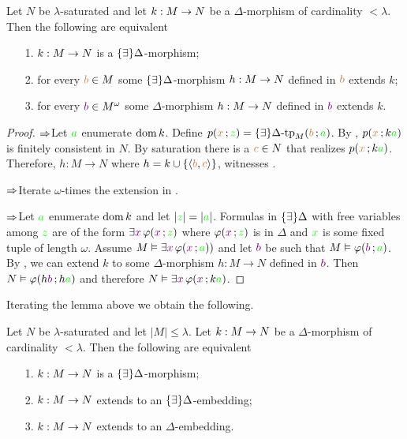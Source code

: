 \begin{proposition}\label{prop_EDelta_estensione}
Let $N$ be $\lambda$-saturated and let $k:M\rightarrow N$ be a $\Delta$-morphism of cardinality $<\lambda$. Then the following are equivalent
\begin{itemize}
\item[1.] $k:M\rightarrow N$ is a $\{\exists\}\Delta$-morphism;
\item[2.] for every ${\color{brown} b}\in M$ some $\{\exists\}\Delta$-morphism $h:M\rightarrow N$ defined in ${\color{brown} b}$ extends $k$;
\item[3.] for every ${\color{violet} b}\in M^{\omega}$ some $\Delta$-morphism $h:M\rightarrow N$ defined in ${\color{violet} b}$ extends $k$.
\end{itemize}
\end{proposition}

\begin{proof}
$\Rightarrow$\quad Let ${\color{green} a}$ enumerate $\mathop{\rm dom} k$. Define $p({\color{brown} x}\,;{\color{green} z})=\{\exists\}\Delta\mbox{-}\textrm{tp}_M ({\color{brown} b}\,;{\color{green} a})$. By , $p({\color{brown} x}\,;k{\color{green} a})$ is finitely consistent in $N$. By saturation there is a ${\color{brown} c}\in N$ that realizes $p({\color{brown} x}\,;k{\color{green} a})$. Therefore, $h:M\to N$ where $h=k\cup\{\langle{\color{brown}b},{\color{brown} c}\rangle\}$, witnesses .

$\Rightarrow$\quad Iterate $\omega$-times the extension in . 

$\Rightarrow$\quad Let ${\color{green} a}$ enumerate $\mathop{\rm dom} k$ and let $|{\color{green} z}|=|{\color{green} a}|$. Formulas in $\{\exists\}\Delta$ with free variables among ${\color{green} z}$ are of the form  $\exists {\color{violet}x}\, \varphi ({\color{violet} x}\,;{\color{green} z})$ where $\varphi({\color{violet} x}\,;{\color{green} z})$ is in $\Delta$ and ${\color{green} x}$ is some fixed tuple of length $\omega$. Assume $M\vDash\exists{\color{violet}x}\,\varphi({\color{violet} x}\,;{\color{green} a}))$ and let ${\color{violet} b}$ be such that $M\vDash\varphi({\color{violet} b}\,;{\color{green} a})$. By , we can extend $k$ to some $\Delta$-morphism $h:M\to N$ defined in ${\color{violet} b}$. Then $N\vDash\varphi(h{\color{violet} b}\,;h{\color{green} a})$ and therefore $N\vDash\exists {\color{violet}x}\,\varphi({\color{violet} x}\,;k{\color{green} a})$.
\end{proof}

Iterating the lemma above we obtain the following.

\begin{corollary}\label{corol_EDelta_estensione}
Let $N$ be $\lambda$-saturated and let $|M|\le\lambda$. Let $k:M\rightarrow N$ be a $\Delta$-morphism of cardinality $<\lambda$. Then the following are equivalent
\begin{itemize}
\item[1.] $k:M\rightarrow N$ is a $\{\exists\}\Delta$-morphism;
\item[2.] $k:M\rightarrow N$ extends to an $\{\exists\}\Delta$-embedding;
\item[3.] $k:M\rightarrow N$ extends to an $\Delta$-embedding.\QED
\end{itemize}
\end{corollary}

